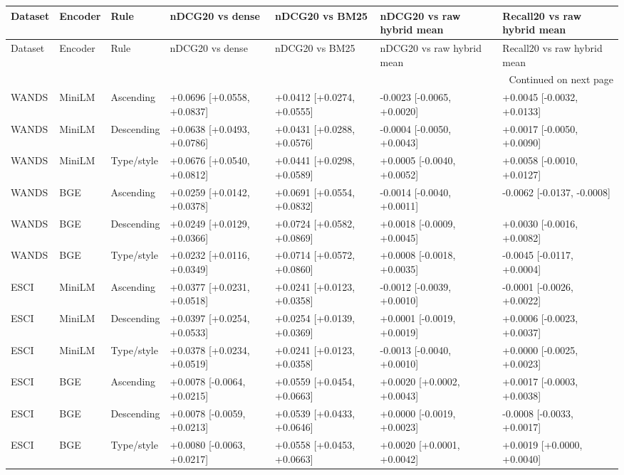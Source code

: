 \begin{longtable}{lllllll}
\toprule
Dataset & Encoder & Rule & nDCG20 vs dense & nDCG20 vs BM25 & nDCG20 vs raw hybrid mean & Recall20 vs raw hybrid mean \\
\midrule
\endfirsthead
\toprule
Dataset & Encoder & Rule & nDCG20 vs dense & nDCG20 vs BM25 & nDCG20 vs raw hybrid mean & Recall20 vs raw hybrid mean \\
\midrule
\endhead
\midrule
\multicolumn{7}{r}{Continued on next page} \\
\midrule
\endfoot
\bottomrule
\endlastfoot
WANDS & MiniLM & Ascending & +0.0696 [+0.0558, +0.0837] & +0.0412 [+0.0274, +0.0555] & -0.0023 [-0.0065, +0.0020] & +0.0045 [-0.0032, +0.0133] \\
WANDS & MiniLM & Descending & +0.0638 [+0.0493, +0.0786] & +0.0431 [+0.0288, +0.0576] & -0.0004 [-0.0050, +0.0043] & +0.0017 [-0.0050, +0.0090] \\
WANDS & MiniLM & Type/style & +0.0676 [+0.0540, +0.0812] & +0.0441 [+0.0298, +0.0589] & +0.0005 [-0.0040, +0.0052] & +0.0058 [-0.0010, +0.0127] \\
WANDS & BGE & Ascending & +0.0259 [+0.0142, +0.0378] & +0.0691 [+0.0554, +0.0832] & -0.0014 [-0.0040, +0.0011] & -0.0062 [-0.0137, -0.0008] \\
WANDS & BGE & Descending & +0.0249 [+0.0129, +0.0366] & +0.0724 [+0.0582, +0.0869] & +0.0018 [-0.0009, +0.0045] & +0.0030 [-0.0016, +0.0082] \\
WANDS & BGE & Type/style & +0.0232 [+0.0116, +0.0349] & +0.0714 [+0.0572, +0.0860] & +0.0008 [-0.0018, +0.0035] & -0.0045 [-0.0117, +0.0004] \\
ESCI & MiniLM & Ascending & +0.0377 [+0.0231, +0.0518] & +0.0241 [+0.0123, +0.0358] & -0.0012 [-0.0039, +0.0010] & -0.0001 [-0.0026, +0.0022] \\
ESCI & MiniLM & Descending & +0.0397 [+0.0254, +0.0533] & +0.0254 [+0.0139, +0.0369] & +0.0001 [-0.0019, +0.0019] & +0.0006 [-0.0023, +0.0037] \\
ESCI & MiniLM & Type/style & +0.0378 [+0.0234, +0.0519] & +0.0241 [+0.0123, +0.0358] & -0.0013 [-0.0040, +0.0010] & +0.0000 [-0.0025, +0.0023] \\
ESCI & BGE & Ascending & +0.0078 [-0.0064, +0.0215] & +0.0559 [+0.0454, +0.0663] & +0.0020 [+0.0002, +0.0043] & +0.0017 [-0.0003, +0.0038] \\
ESCI & BGE & Descending & +0.0078 [-0.0059, +0.0213] & +0.0539 [+0.0433, +0.0646] & +0.0000 [-0.0019, +0.0023] & -0.0008 [-0.0033, +0.0017] \\
ESCI & BGE & Type/style & +0.0080 [-0.0063, +0.0217] & +0.0558 [+0.0453, +0.0663] & +0.0020 [+0.0001, +0.0042] & +0.0019 [+0.0000, +0.0040] \\
\end{longtable}
